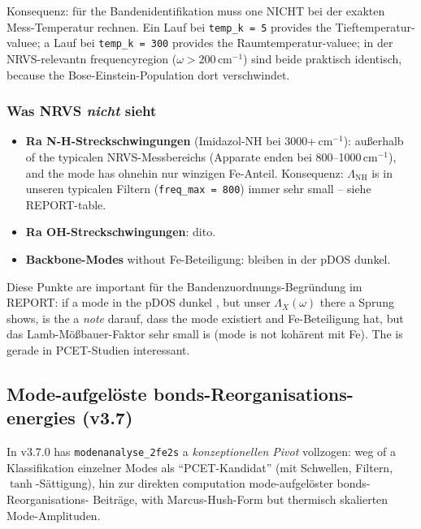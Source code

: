 \documentclass[11pt,a4paper,twoside]{article}
\theoremstyle{remark}
\begin{document}
Konsequenz: f\"ur the Bandenidentifikation muss one NICHT bei der
exakten Mess-Temperatur rechnen. Ein Lauf bei
\texttt{temp\_k = 5} provides the Tieftemperatur-valuee; a Lauf bei
\texttt{temp\_k = 300} provides the Raumtemperatur-valuee; in der
NRVS-relevantn frequencyregion ($\omega > 200$\,cm$^{-1}$) sind
beide praktisch identisch, because the Bose-Einstein-Population dort
verschwindet.

\subsubsection*{Was NRVS \emph{nicht} sieht}

\begin{itemize}\setlength{\itemsep}{0pt}
  \item \textbf{Ra N-H-Streckschwingungen} (Imidazol-NH bei 3000+\,cm$^{-1}$):
        au{\ss}erhalb of the typicalen NRVS-Messbereichs (Apparate enden
        bei 800--1000\,cm$^{-1}$), and the mode has ohnehin nur
        winzigen Fe-Anteil. Konsequenz: $\Lambda_\text{NH}$ is in
        unseren typicalen Filtern (\texttt{freq\_max = 800}) immer
        sehr small -- siehe REPORT-table.
  \item \textbf{Ra OH-Streckschwingungen}: dito.
  \item \textbf{Backbone-Modes} without Fe-Beteiligung: bleiben in der
        pDOS dunkel.
\end{itemize}

Diese Punkte are important f\"ur the Bandenzuordnungs-Begr\"undung im
REPORT: if a mode in the pDOS dunkel , but unser
$\Lambda_X(\omega)$ there a Sprung shows, is the a \emph{note}
darauf, dass the mode existiert and Fe-Beteiligung hat, but das
Lamb-M\"o{\ss}bauer-Faktor sehr small is (mode is not koh\"arent
mit Fe). The is gerade in PCET-Studien interessant.


\subsection{Mode-aufgel\"oste bonds-Reorganisations-energies (v3.7)}
\label{sec:reorg}

In v3.7.0 has \texttt{modenanalyse\_2fe2s} a \emph{konzeptionellen
Pivot} vollzogen: weg of a Klassifikation einzelner Modes als
"`PCET-Kandidat"' (mit Schwellen, Filtern, $\tanh$-S\"attigung), hin
zur direkten computation mode-aufgel\"oster bonds-Reorganisations-
Beitr\"age, with Marcus-Hush-Form but thermisch skalierten
Mode-Amplituden.
\end{document}
